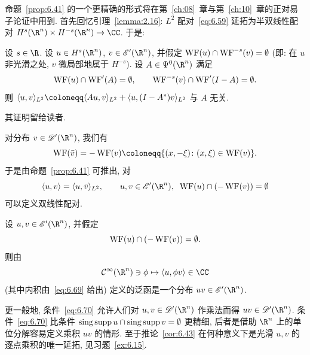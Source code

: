 命题~\ref{prop:6.41} 的一个更精确的形式将在第~\ref{ch:08}~章与第~\ref{ch:10}~章的正对易子论证中用到. 首先回忆引理~\ref{lemma:2.16}: $L^2$ 配对~\eqref{eq:6.59} 延拓为半双线性配对 $H^s(\R^n) \times H^{-s}(\R^n) \to \CC$. 于是:

\begin{lemma}[带 $H^s$ 波前集条件的 $L^2$ 配对]\label{lem:6.42}
设 $s \in \R$. 设 $u \in H^s(\R^n)$, $v \in \mathscr{E}'(\R^n)$, 并假定 $\operatorname{WF}(u) \cap \operatorname{WF}^{-s}(v) = \emptyset$ (即: 在 $u$ 非光滑之处, $v$ 微局部地属于 $H^{-s}$). 设 $A \in \Psi^0(\R^n)$ 满足
\begin{equation}\label{eq:6.67}
    \operatorname{WF}(u) \cap \operatorname{WF}'(A) = \emptyset, \qquad \operatorname{WF}^{-s}(v) \cap \operatorname{WF}'(I - A) = \emptyset.
\end{equation}
则 $\langle u, v \rangle_{L^2} \defeq \langle A u, v \rangle_{L^2} + \langle u, (I - A^*) v \rangle_{L^2}$ 与 $A$ 无关.
\end{lemma}

其证明留给读者.

对分布 $v \in \Distr(\R^n)$, 我们有
\begin{equation}\label{eq:6.68}
    \WF(\bar{v}) = -\WF(v) \defeq \{(x, -\xi) \colon (x, \xi) \in \WF(v)\}.
\end{equation}
于是由命题~\ref{prop:6.41} 可推出, 对
\begin{equation}\label{eq:6.69}
    \langle u, v \rangle = \langle u, \bar{v} \rangle_{L^2}, \qquad u, v \in \mathscr{E}'(\R^n), \;\; \WF(u) \cap (-\WF(v)) = \emptyset
\end{equation}
可以定义双线性配对.

\begin{corollary}[分布的乘积]\label{cor:6.43}
设 $u, v \in \mathscr{E}'(\R^n)$, 并假定
\begin{equation}\label{eq:6.70}
    \operatorname{WF}(u) \cap (-\operatorname{WF}(v)) = \emptyset.
\end{equation}
则由
\begin{equation}\label{eq:6.71}
    \Smooth(\R^n) \ni \phi \mapsto \langle u, \phi v \rangle \in \CC
\end{equation}
(其中内积由~\eqref{eq:6.69} 给出) 定义的泛函是一个分布 $u v \in \mathscr{E}'(\R^n)$.
\end{corollary}

更一般地, 条件~\eqref{eq:6.70} 允许人们对 $u, v \in \Distr(\R^n)$ 作乘法而得 $u v \in \Distr(\R^n)$. 条件~\eqref{eq:6.70} 比条件 $\operatorname{sing\,supp} u \cap \operatorname{sing\,supp} v = \emptyset$ 更精细, 后者是借助 $\R^n$ 上的单位分解容易定义乘积 $u v$ 的情形. 至于推论~\ref{cor:6.43} 在何种意义下是光滑 $u, v$ 的逐点乘积的唯一延拓, 见习题~\ref{ex:6.15}.

